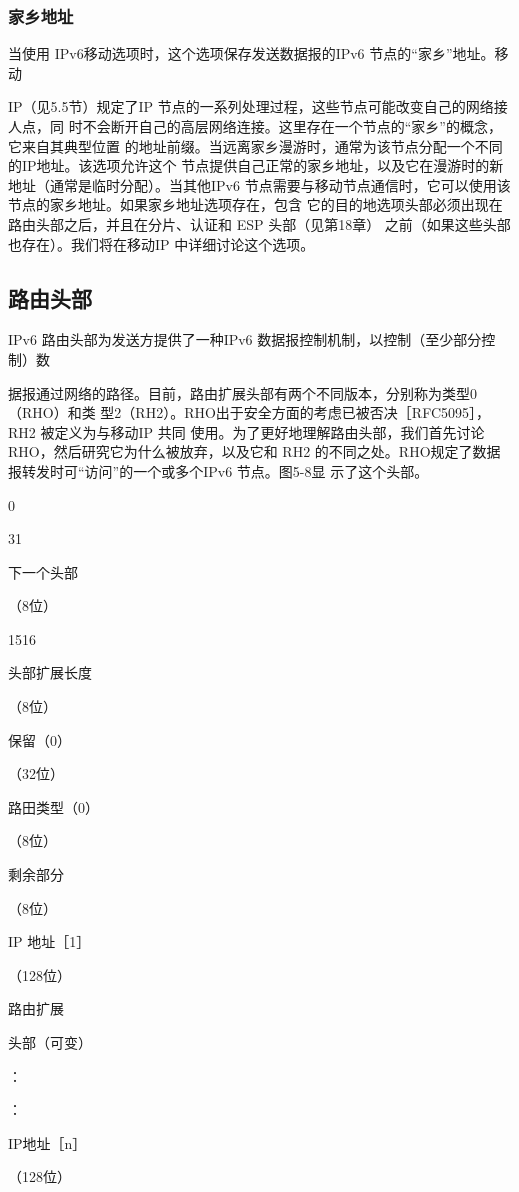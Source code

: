\subsubsection{家乡地址}
当使用 IPv6移动选项时，这个选项保存发送数据报的IPv6 节点的“家乡”地址。移动

IP（见5.5节）规定了IP 节点的一系列处理过程，这些节点可能改变自己的网络接人点，同
时不会断开自己的高层网络连接。这里存在一个节点的“家乡”的概念，它来自其典型位置
的地址前缀。当远离家乡漫游时，通常为该节点分配一个不同的IP地址。该选项允许这个
节点提供自己正常的家乡地址，以及它在漫游时的新地址（通常是临时分配）。当其他IPv6
节点需要与移动节点通信时，它可以使用该节点的家乡地址。如果家乡地址选项存在，包含
它的目的地选项头部必须出现在路由头部之后，并且在分片、认证和 ESP 头部（见第18章）
之前（如果这些头部也存在）。我们将在移动IP 中详细讨论这个选项。

\subsection{路由头部}
IPv6 路由头部为发送方提供了一种IPv6 数据报控制机制，以控制（至少部分控制）数

据报通过网络的路径。目前，路由扩展头部有两个不同版本，分别称为类型0（RHO）和类
型2（RH2）。RHO出于安全方面的考虑已被否决［RFC5095］，RH2 被定义为与移动IP 共同
使用。为了更好地理解路由头部，我们首先讨论 RHO，然后研究它为什么被放弃，以及它和
RH2 的不同之处。RHO规定了数据报转发时可“访问”的一个或多个IPv6 节点。图5-8显
示了这个头部。

0

31

下一个头部

（8位）

1516

头部扩展长度

（8位）

保留（0）

（32位）

路田类型（0）

（8位）

剩余部分

（8位）

IP 地址［1］

（128位）

路由扩展

头部（可变）

：

：

IP地址［n］

（128位）

